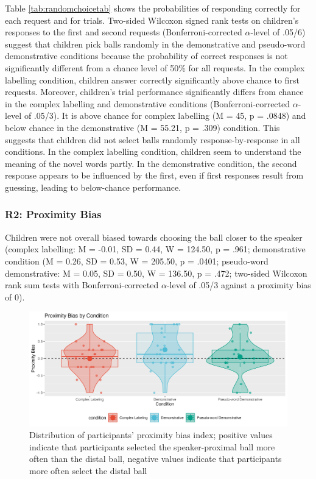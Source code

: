 \documentclass[
  man,floatsintext]{apa6}
\begin{document}
Table \ref{tab:randomchoicetab} shows the probabilities of responding correctly for each request and for trials. Two-sided Wilcoxon signed rank tests on children's responses to the first and second requests (Bonferroni-corrected \(\alpha\)-level of .05/6) suggest that children pick balls randomly in the demonstrative and pseudo-word demonstrative conditions because the probability of correct responses is not significantly different from a chance level of 50\% for all requests. In the complex labelling condition, children answer correctly significantly above chance to first requests. Moreover, children's trial performance significantly differs from chance in the complex labelling and demonstrative conditions (Bonferroni-corrected \(\alpha\)-level of .05/3). It is above chance for complex labelling (M = 45, p = .0848) and below chance in the demonstrative (M = 55.21, p = .309) condition. This suggests that children did not select balls randomly response-by-response in all conditions. In the complex labelling condition, children seem to understand the meaning of the novel words partly. In the demonstrative condition, the second response appears to be influenced by the first, even if first responses result from guessing, leading to below-chance performance.

\subsubsection{R2: Proximity Bias}\label{r2-proximity-bias}

Children were not overall biased towards choosing the ball closer to the speaker (complex labelling: M = -0.01, SD = 0.44, W = 124.50, p = .961; demonstrative condition (M = 0.26, SD = 0.53, W = 205.50, p = .0401; pseudo-word demonstrative: M = 0.05, SD = 0.50, W = 136.50, p = .472; two-sided Wilcoxon rank sum tests with Bonferroni-corrected \(\alpha\)-level of .05/3 against a proximity bias of 0).

\begin{figure}
\centering
\includegraphics{images/figure3_proxibiasplot.png}
\caption{\label{fig:proxibiasplot}Distribution of participants' proximity bias index; positive values indicate that participants selected the speaker-proximal ball more often than the distal ball, negative values indicate that participants more often select the distal ball}
\end{figure}
\end{document}
